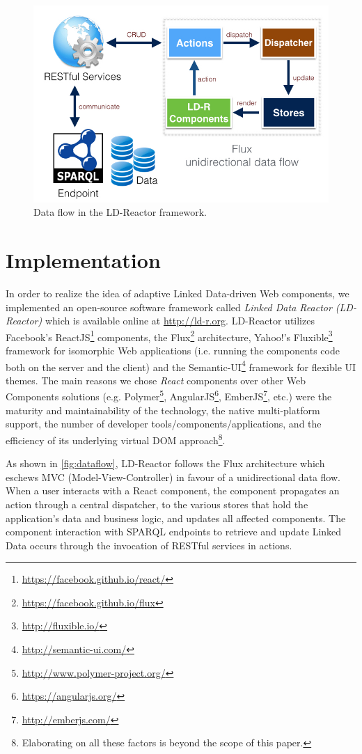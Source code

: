 \documentclass{acm_proc_article-sp}
\begin{document}
\begin{figure}[tb]
  \includegraphics[width=.9\linewidth]{images/dataflow.jpg}
  \caption{Data flow in the LD-Reactor framework.}
  \label{fig:dataflow}
\end{figure}

\section{Implementation}

In order to realize the idea of adaptive Linked Data-driven Web components, we implemented an open-source software framework called \emph{Linked Data Reactor (LD-Reactor)} which is available online at \url{http://ld-r.org}.
LD-Reactor utilizes Facebook's ReactJS\footnote{\url{https://facebook.github.io/react/}} components, the Flux\footnote{\url{https://facebook.github.io/flux}} architecture, Yahoo!'s Fluxible\footnote{\url{http://fluxible.io/}} framework for isomorphic Web applications (i.e. running the components code both on the server and the client) and the Semantic-UI\footnote{\url{http://semantic-ui.com/}} framework for flexible UI themes.
The main reasons we chose \emph{React} components over other  Web Components solutions (e.g. Polymer\footnote{\url{http://www.polymer-project.org/}}, AngularJS\footnote{\url{https://angularjs.org/}}, EmberJS\footnote{\url{http://emberjs.com/}}, etc.) were the maturity and maintainability of the technology, the native multi-platform support, the number of developer tools/components/applications, and the efficiency of its underlying virtual DOM approach\footnote{Elaborating on all these factors is beyond the scope of this paper.}.

As shown in \autoref{fig:dataflow}, LD-Reactor follows the Flux architecture which eschews MVC (Model-View-Controller) in favour of a unidirectional data flow. 
When a user interacts with a React component, the component propagates an action through a central dispatcher, to the various stores that hold the application's data and business logic, and updates all affected components. 
The component interaction with SPARQL endpoints to retrieve and update Linked Data occurs through the invocation of RESTful services in actions.
\end{document}
